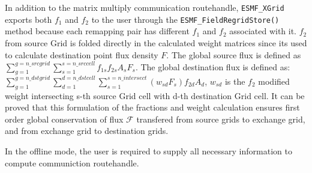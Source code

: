 In addition to the matrix multiply communication routehandle, 
{\tt ESMF\_XGrid} exports both $f_1$ and $f_2$ to the user through the {\tt ESMF\_FieldRegridStore()} method
because each remapping pair has different $f_1$ and $f_2$ associated with it. $f_2$ from source Grid is 
folded directly in the calculated weight matrices since its used to calculate destination point flux
density $F$. The global source flux is defined as $\sum_{g=1}^{g=n\_srcgrid}\sum_{s=1}^{s=n\_srccell}{ f_{1s} f_{2s} A_s F_s }$.
The global destination flux is defined as: 
$\sum_{g=1}^{g=n\_dstgrid}\sum_{d=1}^{d=n\_dstcell}{ \sum_{s=1}^{s=n\_intersect}(w_{sd} F_s) f_{2d} A_d}$, $w_{sd}$ is the
$f_2$ modified weight intersecting s-th source Grid cell with d-th destination Grid cell.
It can be proved that this formulation of the fractions and 
weight calculation ensures first order global conservation of
flux $\mathcal{F}$ transfered from source grids to exchange grid, and from exchange grid to destination grids.

In the offline mode, the user is required to supply all necessary information to 
compute communiction routehandle.

